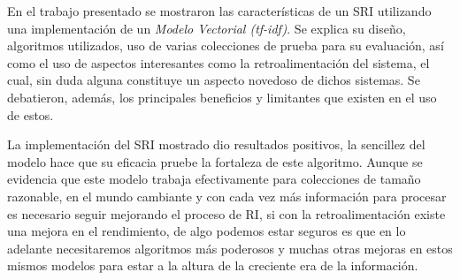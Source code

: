 En el trabajo presentado se mostraron las características de un SRI utilizando
una implementación de un \emph{Modelo Vectorial (tf-idf)}. Se explica su
diseño, algoritmos utilizados, uso de varias colecciones de prueba para su
evaluación, así como el uso de aspectos interesantes como la retroalimentación
del sistema, el cual, sin duda alguna constituye un aspecto novedoso de dichos
sistemas. Se debatieron, además, los principales beneficios y limitantes que
existen en el uso de estos.

La implementación del SRI mostrado dio resultados positivos, la sencillez del
modelo hace que su eficacia pruebe la fortaleza de este algoritmo. Aunque se
evidencia que este modelo trabaja efectivamente para colecciones de tamaño
razonable, en el mundo cambiante y con cada vez más información para procesar
es necesario seguir mejorando el proceso de RI, si con la retroalimentación
existe una mejora en el rendimiento, de algo podemos estar seguros es que en
lo adelante necesitaremos algoritmos más poderosos y muchas otras mejoras en
estos mismos modelos para estar a la altura de la creciente era de la
información.